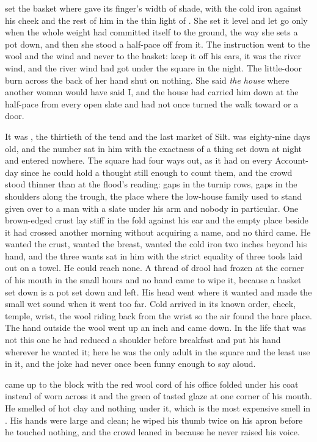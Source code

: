 
 set the basket where  gave its finger's width of shade, with the cold iron against his cheek and the rest of him in the thin light of . She set it level and let go only when the whole weight had committed itself to the ground, the way she sets a pot down, and then she stood a half-pace off from it. The instruction went to the wool and the wind and never to the basket: keep it off his ears, it was the river wind, and the river wind had got under the square in the night. The little-door burn across the back of her hand shut on nothing. She said \emph{the house} where another woman would have said I, and the house had carried him down at the half-pace from every open slate and had not once turned the walk toward  or a door.

It was , the thirtieth of the tend and the last market of Silt.  was eighty-nine days old, and the number sat in him with the exactness of a thing set down at night and entered nowhere. The square had four ways out, as it had on every Account-day since he could hold a thought still enough to count them, and the crowd stood thinner than at the flood's reading: gaps in the turnip rows, gaps in the shoulders along the trough, the place where the low-house family used to stand given over to a man with a slate under his arm and nobody in particular. One brown-edged crust lay stiff in the fold against his ear and the empty place beside it had crossed another morning without acquiring a name, and no third came. He wanted the crust, wanted the breast, wanted the cold iron two inches beyond his hand, and the three wants sat in him with the strict equality of three tools laid out on a towel. He could reach none. A thread of drool had frozen at the corner of his mouth in the small hours and no hand came to wipe it, because a basket set down is a pot set down and left. His head went where it wanted and made the small wet sound when it went too far. Cold arrived in its known order, cheek, temple, wrist, the wool riding back from the wrist so the air found the bare place. The hand outside the wool went up an inch and came down. In the life that was not this one he had reduced a shoulder before breakfast and put his hand wherever he wanted it; here he was the only adult in the square and the least use in it, and the joke had never once been funny enough to say aloud.

 came up to the block with the red wool cord of his office folded under his coat instead of worn across it and the green of tasted glaze at one corner of his mouth. He smelled of hot clay and nothing under it, which is the most expensive smell in . His hands were large and clean; he wiped his thumb twice on his apron before he touched nothing, and the crowd leaned in because he never raised his voice.

